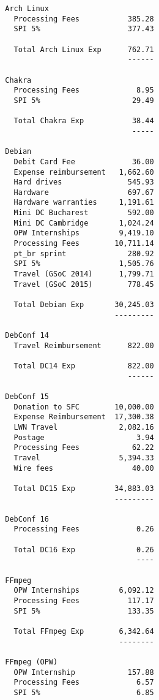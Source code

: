 \documentclass[letterpaper]{report}
\begin{document}
\begin{verbatim}
        Arch Linux
          Processing Fees           385.28
          SPI 5%                    377.43

          Total Arch Linux Exp      762.71
                                    ------

        Chakra
          Processing Fees             8.95
          SPI 5%                     29.49

          Total Chakra Exp           38.44
                                     -----

        Debian
          Debit Card Fee             36.00
          Expense reimbursement   1,662.60
          Hard drives               545.93
          Hardware                  697.67
          Hardware warranties     1,191.61
          Mini DC Bucharest         592.00
          Mini DC Cambridge       1,024.24
          OPW Internships         9,419.10
          Processing Fees        10,711.14
          pt_br sprint              280.92
          SPI 5%                  1,505.76
          Travel (GSoC 2014)      1,799.71
          Travel (GSoC 2015)        778.45

          Total Debian Exp       30,245.03
                                 ---------

        DebConf 14
          Travel Reimbursement      822.00

          Total DC14 Exp            822.00
                                    ------

        DebConf 15
          Donation to SFC        10,000.00
          Expense Reimbursement  17,300.38
          LWN Travel              2,082.16
          Postage                     3.94
          Processing Fees            62.22
          Travel                  5,394.33
          Wire fees                  40.00

          Total DC15 Exp         34,883.03
                                 ---------

        DebConf 16
          Processing Fees             0.26

          Total DC16 Exp              0.26
                                      ----

        FFmpeg
          OPW Internships         6,092.12
          Processing Fees           117.17
          SPI 5%                    133.35

          Total FFmpeg Exp        6,342.64
                                  --------

        FFmpeg (OPW)
          OPW Internship            157.88
          Processing Fees             6.57
          SPI 5%                      6.85


\end{verbatim}
\end{document}
